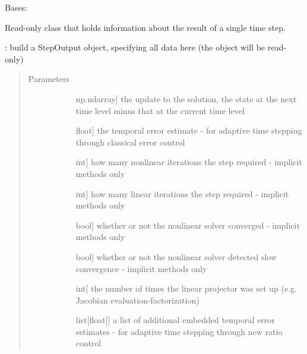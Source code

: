 \documentclass[letterpaper,10pt,english]{sphinxmanual}
\begin{document}
\begin{fulllineitems}
\label{\detokenize{spitfire.time.methods:spitfire.time.methods.StepOutput}}
Bases: 

Read-only class that holds information about the result of a single time step.

: build a StepOutput object, specifying all data here (the object will be read-only)
\begin{quote}\begin{description}
\item[{Parameters}] \leavevmode\begin{description}
\item[{}] \leavevmode{[}np.ndarray{]}
the update to the solution, the state at the next time level minus that at the current time level

\item[{}] \leavevmode{[}float{]}
the temporal error estimate - for adaptive time stepping through classical error control

\item[{}] \leavevmode{[}int{]}
how many nonlinear iterations the step required - implicit methods only

\item[{}] \leavevmode{[}int{]}
how many linear iterations the step required - implicit methods only

\item[{}] \leavevmode{[}bool{]}
whether or not the nonlinear solver converged - implicit methods only

\item[{}] \leavevmode{[}bool{]}
whether or not the nonlinear solver detected slow convergence - implicit methods only

\item[{}] \leavevmode{[}int{]}
the number of times the linear projector was set up (e.g. Jacobian evaluation-factorization)

\item[{}] \leavevmode{[}list{[}float{]}{]}
a list of additional embedded temporal error estimates - for adaptive time stepping through new ratio control


\end{description}
\end{description}
\end{quote}
\end{fulllineitems}
\end{document}
